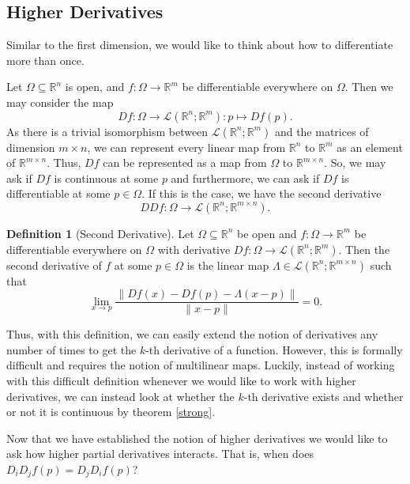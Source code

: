 \documentclass[
]{article}
\theoremstyle{definition}
\theoremstyle{definition}
\newtheorem{definition}{Definition}[section]
\begin{document}
\hypertarget{higher-derivatives}{%
\subsection{Higher Derivatives}\label{higher-derivatives}}

Similar to the first dimension, we would like to think about how to
differentiate more than once.

Let \(\Omega \subseteq \mathbb{R}^n\) is open, and
\(f : \Omega \to \mathbb{R}^m\) be differentiable everywhere on
\(\Omega\). Then we may consider the map
\[Df : \Omega \to \mathcal{L}(\mathbb{R}^n; \mathbb{R}^m) : p \mapsto Df(p).\]
As there is a trivial isomorphism between
\(\mathcal{L}(\mathbb{R}^n; \mathbb{R}^m)\) and the matrices of
dimension \(m \times n\), we can represent every linear map from
\(\mathbb{R}^n\) to \(\mathbb{R}^m\) as an element of
\(\mathbb{R}^{m \times n}\). Thus, \(Df\) can be represented as a map
from \(\Omega\) to \(\mathbb{R}^{m \times n}\). So, we may ask if \(Df\)
is continuous at some \(p\) and furthermore, we can ask if \(Df\) is
differentiable at some \(p \in \Omega\). If this is the case, we have
the second derivative
\[DDf : \Omega \to \mathcal{L}(\mathbb{R}^n; \mathbb{R}^{m \times n}).\]

\begin{definition}[Second Derivative]
  Let \(\Omega \subseteq \mathbb{R}^n\) be open and \(f : \Omega \to \mathbb{R}^m\) 
  be differentiable everywhere on \(\Omega\) with derivative 
  \(Df : \Omega \to \mathcal{L}(\mathbb{R}^n; \mathbb{R}^m)\). Then the second 
  derivative of \(f\) at some \(p \in \Omega\) is the linear map 
  \(\Lambda \in \mathcal{L}(\mathbb{R}^n; \mathbb{R}^{m \times n})\) such that 
  \[\lim_{x \to p} \frac{\| Df(x) - Df(p) - \Lambda(x - p) \|}{\| x - p\|} = 0.\]
\end{definition}

Thus, with this definition, we can easily extend the notion of
derivatives any number of times to get the \(k\)-th derivative of a
function. However, this is formally difficult and requires the notion of
multilinear maps. Luckily, instead of working with this difficult
definition whenever we would like to work with higher derivatives, we
can instead look at whether the \(k\)-th derivative exists and whether
or not it is continuous by theorem \ref{strong}.

Now that we have established the notion of higher derivatives we would
like to ask how higher partial derivatives interacts. That is, when does
\(D_i D_j f(p) = D_j D_i f(p)\)?
\end{document}
